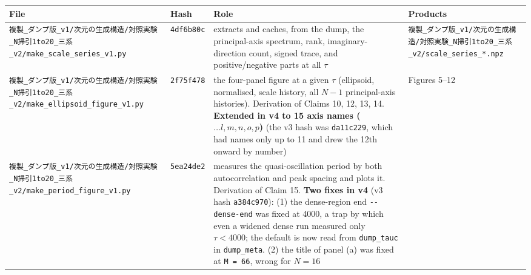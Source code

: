 \documentclass[
  10pt,
]{article}
\newcounter{none} %
\begin{document}
{\def\LTcaptype{none} %
\begin{longtable}[]{@{}
  >{\raggedright\arraybackslash}p{}
  >{\raggedright\arraybackslash}p{}
  >{\raggedright\arraybackslash}p{}
  >{\raggedright\arraybackslash}p{}@{}}
\toprule\noalign{}
\begin{minipage}[b]{\linewidth}\raggedright
File
\end{minipage} & \begin{minipage}[b]{\linewidth}\raggedright
Hash
\end{minipage} & \begin{minipage}[b]{\linewidth}\raggedright
Role
\end{minipage} & \begin{minipage}[b]{\linewidth}\raggedright
Products
\end{minipage} \\
\midrule\noalign{}
\endhead
\bottomrule\noalign{}
\endlastfoot
\texttt{複製\_ダンプ版\_v1/次元の生成構造/対照実験\_N掃引1to20\_三系\_v2/make\_scale\_series\_v1.py}
& \texttt{4df6b80c} & extracts and caches, from the dump, the
principal-axis spectrum, rank, imaginary-direction count, signed trace,
and positive/negative parts at all \(\tau\) &
\texttt{複製\_ダンプ版\_v1/次元の生成構造/対照実験\_N掃引1to20\_三系\_v2/scale\_series\_*.npz} \\
\texttt{複製\_ダンプ版\_v1/次元の生成構造/対照実験\_N掃引1to20\_三系\_v2/make\_ellipsoid\_figure\_v1.py}
& \texttt{2f75f478} & the four-panel figure at a given \(\tau\)
(ellipsoid, normalised, scale history, all \(N-1\) principal-axis
histories). Derivation of Claims 10, 12, 13, 14. \textbf{Extended in v4
to 15 axis names (\(\dots l,m,n,o,p\))} (the v3 hash was
\texttt{da11c229}, which had names only up to 11 and drew the 12th
onward by number) & Figures 5--12 \\
\texttt{複製\_ダンプ版\_v1/次元の生成構造/対照実験\_N掃引1to20\_三系\_v2/make\_period\_figure\_v1.py}
& \texttt{5ea24de2} & measures the quasi-oscillation period by both
autocorrelation and peak spacing and plots it. Derivation of Claim 15.
\textbf{Two fixes in v4} (v3 hash \texttt{a384c970}): (1) the
dense-region end \texttt{-\/-dense-end} was fixed at 4000, a trap by
which even a widened dense run measured only \(\tau<4000\); the default
is now read from \texttt{dump\_tauc} in \texttt{dump\_meta}. (2) the
title of panel (a) was fixed at \texttt{M\ =\ 66}, wrong for \(N=16\)

\end{longtable}}
\end{document}
